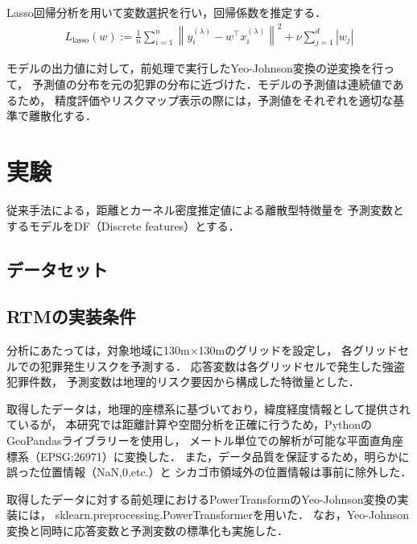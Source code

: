 Lasso回帰分析を用いて変数選択を行い，回帰係数を推定する．
\begin{align*} 
  L_\mathrm{lasso}(w) := \frac{1}{n}\sum_{i=1}^n\left\|y^{(\lambda)}_i-w^\top x_i^{(\lambda)}\right\|^2 + \nu\sum_{j=1}^{d}|w_j|
\end{align*}


モデルの出力値に対して，前処理で実行したYeo-Johnson変換の逆変換を行って，
予測値の分布を元の犯罪の分布に近づけた．モデルの予測値は連続値であるため，
精度評価やリスクマップ表示の際には，予測値をそれぞれを適切な基準で離散化する．
 

\section{実験}
従来手法\cite{caplan2015risk}による，距離とカーネル密度推定値\cite{bishop2007}による離散型特徴量を
予測変数とするモデルをDF（Discrete features）とする．

\subsection{データセット}


\subsection{RTMの実装条件}
分析にあたっては，対象地域に130m×130mのグリッドを設定し，
各グリッドセルでの犯罪発生リスクを予測する．
応答変数は各グリッドセルで発生した強盗犯罪件数，
予測変数は地理的リスク要因から構成した特徴量とした．

取得したデータは，地理的座標系に基づいており，緯度経度情報として提供されているが，
本研究では距離計算や空間分析を正確に行うため，PythonのGeoPandasライブラリー\cite{geopandas}を使用し，
メートル単位での解析が可能な平面直角座標系（EPSG:26971）に変換した．
また，データ品質を保証するため，明らかに誤った位置情報（NaN,0,etc.）と
シカゴ市領域外の位置情報は事前に除外した．

取得したデータに対する前処理におけるPowerTransformのYeo-Johnson変換の実装には，
sklearn.preprocessing.PowerTransformer\cite{scikit-learn}を用いた．
なお，Yeo-Johnson変換と同時に応答変数と予測変数の標準化も実施した．

